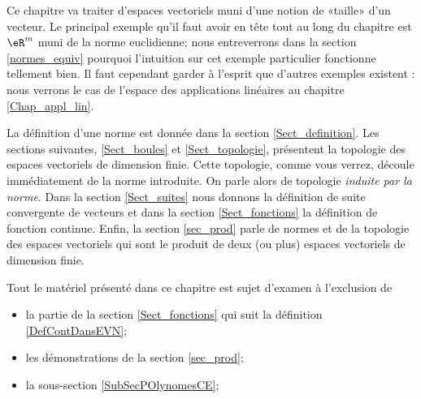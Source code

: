 
Ce chapitre va traiter d'espaces vectoriels muni d'une notion de «taille» d'un vecteur. Le principal exemple qu'il faut avoir en tête tout au long du chapitre est $\eR^m$ muni de la norme euclidienne; nous entreverrons dans la section \ref{normes_equiv} pourquoi l'intuition sur cet exemple particulier fonctionne tellement bien. Il faut cependant garder à l'esprit que d'autres exemples existent : nous verrons le cas de l'espace des applications linéaires au chapitre \ref{Chap_appl_lin}.

La définition d'une norme est donnée dans la section \ref{Sect_definition}. Les sections suivantes, \ref{Sect_boules} et \ref{Sect_topologie}, présentent la topologie des espaces vectoriels de dimension finie. Cette topologie, comme vous verrez, découle immédiatement de la norme introduite. On parle alors de topologie \emph{induite par la norme}. Dans la section \ref{Sect_suites} nous  donnons la définition de suite convergente de vecteurs et dans la section \ref{Sect_fonctions} la définition de fonction continue. Enfin, la section \ref{sec_prod} parle de normes et de la topologie des espaces vectoriels qui sont le produit de deux (ou plus) espaces vectoriels de dimension finie.

Tout le matériel présenté dans ce chapitre est sujet d'examen à l'exclusion de

\begin{itemize}
\item la partie de la section \ref{Sect_fonctions} qui suit la définition \ref{DefContDansEVN};
\item les démonstrations de la section \ref{sec_prod};
\item la sous-section \ref{SubSecPOlynomesCE};
\end{itemize}
